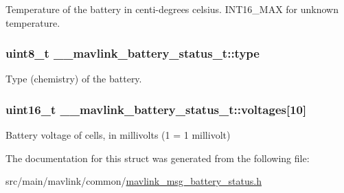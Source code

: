 Temperature of the battery in centi-\/degrees celsius. I\+N\+T16\+\_\+\+M\+A\+X for unknown temperature. 

\hypertarget{struct____mavlink__battery__status__t_a9dbaa36faa0b0305c78c0336494a2415}{
\subsubsection[{type}]{\setlength{\rightskip}{0pt plus 5cm}uint8\+\_\+t \+\_\+\+\_\+mavlink\+\_\+battery\+\_\+status\+\_\+t\+::type}}\label{struct____mavlink__battery__status__t_a9dbaa36faa0b0305c78c0336494a2415}


Type (chemistry) of the battery. 

\hypertarget{struct____mavlink__battery__status__t_a81813055c78457f14d966fbf2c90c11a}{
\subsubsection[{voltages}]{\setlength{\rightskip}{0pt plus 5cm}uint16\+\_\+t \+\_\+\+\_\+mavlink\+\_\+battery\+\_\+status\+\_\+t\+::voltages\mbox{[}10\mbox{]}}}\label{struct____mavlink__battery__status__t_a81813055c78457f14d966fbf2c90c11a}


Battery voltage of cells, in millivolts (1 = 1 millivolt) 



The documentation for this struct was generated from the following file\+:\begin{DoxyCompactItemize}
\item 
src/main/mavlink/common/\hyperlink{mavlink__msg__battery__status_8h}{mavlink\+\_\+msg\+\_\+battery\+\_\+status.\+h}\end{DoxyCompactItemize}
